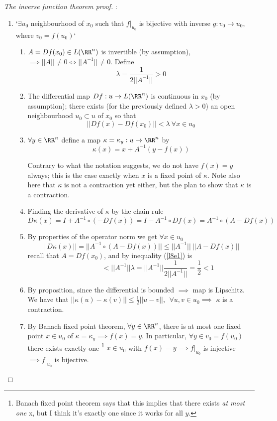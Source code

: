 \begin{proof}[The inverse function theorem proof]
  \par :
  \begin{enumerate}[I]
  \item `$\exists u_0$ neighbourhood of $x_0$ such that $f|_{u_0}$ is bijective with inverse $g: v_0 \rightarrow u_0$, where $v_0 = f(u_0)$`
    \begin{enumerate}
    \item $A = Df(x_0) \in L(\RR^n)$ is invertible (by assumption), $\implies ||A|| \neq 0 \iff ||A^{-1}|| \neq 0$. Define
      $$\lambda = \frac{1}{2||A^{-1}||} > 0$$
    \item The differential map $Df: u \rightarrow L(\RR^n)$ is continuous in $x_0$ (by assumption); there exists (for the previously defined $\lambda > 0$) an open neighbourhood $u_0 \subset u$ of $x_0$ so that
      \begin{equation}
        \label{l8e1}
        ||Df(x) - Df(x_0)|| < \lambda \: \forall x \in u_0
        \end{equation}
    \item $\forall y \in \RR^n$ define a map $\kappa = \kappa_y: u \rightarrow \RR^n$ by
      \begin{equation}
        \label{l8e2}
        \kappa(x) = x + A^{-1}(y - f(x))
      \end{equation}
      \begin{rem}
        Contrary to what the notation suggests, we do not have $f(x) = y$ always; this is the case exactly when $x$ is a fixed point of $\kappa$. Note also here that $\kappa$ is not a contraction yet either, but the plan to show that $\kappa$ is a contraction.
      \end{rem}
    \item Finding the derivative of $\kappa$ by the chain rule
      $$D\kappa(x) = I + A^{-1}\circ(-Df(x)) = I - A^{-1}\circ Df(x) = A^{-1} \circ(A-Df(x))$$
    \item By properties of the operator norm we get $\forall x \in u_0$
      $$||D\kappa(x)|| = ||A^{-1} \circ(A-Df(x))|| \leq ||A^{-1}||\:||A-Df(x)||$$
      recall that $A = Df(x_0)$, and by inequality (\ref{l8e1}) is
      $$\phantom{||D\kappa(x)||} < ||A^{-1}||\lambda = ||A^{-1}||\frac{1}{2||A^{-1}||}=\frac{1}{2} < 1$$
    \item By proposition, since the differential is bounded $\implies$ map is Lipschitz. We have that $||\kappa(u) - \kappa(v)|| \leq \frac{1}{2}||u-v||, \:\:\forall u,v \in u_0 \implies $ $\kappa$ is a contraction.
    \item By Banach fixed point theorem, $\forall y \in \RR^n$, there is at most one fixed point $x\in u_0$ of $\kappa = \kappa_y \implies f(x) = y$. In particular, $\forall y \in v_0 = f(u_0)$ there exists exactly one \footnote{Banach fixed point theorem says that this implies that there exists \emph{at most one} x, but I think it's exactly one since it works for all $y$.} $x \in u_0$ with $f(x) = y \implies f|_{u_0}$ is injective $\implies f|_{u_0}$ is bijective.
    \end{enumerate}
    

\end{enumerate}
\end{proof}
